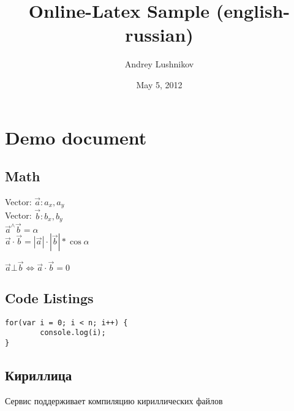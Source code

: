 \documentclass[12pt, a4paper]{article}
\author{Andrey Lushnikov}
\title{Online-Latex Sample (english-russian)}
\date{May 5, 2012}
\begin{document}
\maketitle
\tableofcontents
\section{Demo document}
\subsection{Math}

Vector: $\vec{a}: a_x, a_y$ \\
Vector: $\vec{b}: b_x, b_y$ \\
$\vec{a} ^\wedge \vec{b} = \alpha$ \\
$\vec{a} \cdot \vec{b} = |\vec{a}| \cdot |\vec{b}| * \cos \alpha$

$\vec{a} \bot \vec{b} \Leftrightarrow \vec{a} \cdot \vec{b} = 0$

\subsection{Code Listings}
\begin{lstlisting}
for(var i = 0; i < n; i++) {
        console.log(i);
}
\end{lstlisting}

\subsection{Кириллица}
Сервис поддерживает компиляцию кириллических файлов
\end{document}
